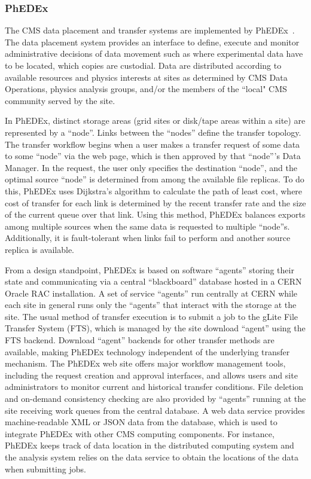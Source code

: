 \subsubsection{PhEDEx}
\label{sec:3_1_4}
The CMS data placement and transfer systems are implemented by
PhEDEx~\cite{RefPhEDEx}. The data placement system provides an
interface to define, execute and monitor administrative decisions of
data movement such as where experimental data have to be located, which
copies are custodial. %
Data are distributed according to available resources
and physics interests at sites as determined by CMS Data Operations,
physics analysis groups, and/or the members of the ``local" CMS community served by the site.

In PhEDEx, distinct storage areas (grid sites or disk/tape areas
within a site) are represented by a ``node''.  Links between the ``nodes''
define the transfer topology.  The transfer workflow begins when a
user makes a transfer request of some data to some ``node'' via the web
page, which is then approved by that ``node'''s Data Manager.  In the
request, the user only specifies the destination ``node'', and the optimal
source ``node'' is determined from among the available file replicas.  To
do this, PhEDEx uses Dijkstra's algorithm to calculate the path of
least cost, where cost of transfer for each link is determined by the
recent transfer rate and the size of the current queue over that link.
Using this method, PhEDEx balances exports among multiple sources when
the same data is requested to multiple ``node''s. Additionally, it is 
fault-tolerant when links fail to perform and another source replica
is available.

From a design standpoint, PhEDEx is based on software ``agents'' storing their state and
communicating via a central ``blackboard'' database hosted in a
CERN Oracle RAC installation. A set of service ``agents''
run centrally at CERN while each site in general runs
only the ``agents'' that interact with the storage at the site. The usual
method of transfer execution is to submit a job to the gLite File Transfer System (FTS), 
which is managed by the site download ``agent'' using the FTS backend.  Download
``agent'' backends for other transfer methods are available, making PhEDEx
technology independent of the underlying transfer mechanism. 
The PhEDEx web site offers major workflow management tools,
including the request creation and approval interfaces, and allows
users and site administrators to monitor current and historical
transfer conditions.  File deletion and on-demand consistency checking
are also provided by ``agents'' running at the site receiving work queues
from the central database.  A web data service provides
machine-readable XML or JSON data from the database, which is used to
integrate PhEDEx with other CMS computing components.  For instance,
PhEDEx keeps track of data location in the distributed computing
system and the analysis system relies on the data service to obtain
the locations of the data when submitting jobs.

